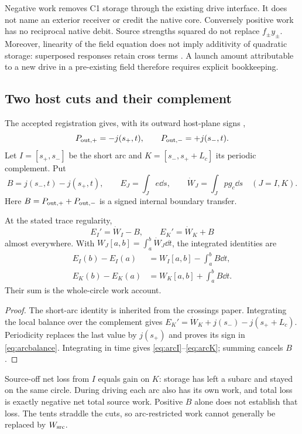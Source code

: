 Negative work removes C1 storage through the existing drive interface. It does not name an exterior receiver or credit the native core. Conversely positive work has no reciprocal native debit. Source strengths squared do not replace $f_\pm y_\pm$. Moreover, linearity of the field equation does not imply additivity of quadratic storage: superposed responses retain cross terms \cite[quadratic storage account]{pairedII}. A launch amount attributable to a new drive in a pre-existing field therefore requires explicit bookkeeping.

\subsection{Two host cuts and their complement}\label{sec:arcs}
The accepted registration gives, with its outward host-plane signs \cite[conditional signed cut powers]{intensity},
\begin{equation}\label{eq:cuts}
 P_{\rm out,+}=-j(s_+,t),\qquad
 P_{\rm out,-}=+j(s_-,t).
\end{equation}
Let $I=[s_+,s_-]$ be the short arc and $K=[s_-,s_++L_c]$ its periodic complement. Put
\begin{equation}\label{eq:arcterms}
 B=j(s_-,t)-j(s_+,t),\qquad
 E_J=\int_J e\dd s,\qquad \dot W_J=\int_J pg_c\dd s
 \quad(J=I,K).
\end{equation}
Here $B=P_{\rm out,+}+P_{\rm out,-}$ is a signed internal boundary transfer.

\begin{proposition}\label{prop:arcs}
At the stated trace regularity,
\begin{equation}\label{eq:arcbalance}
 E_I'=\dot W_I-B,\qquad E_K'=\dot W_K+B
\end{equation}
almost everywhere. With $W_J[a,b]=\int_a^b\dot W_J\dd t$, the integrated identities are
\begin{align}
 E_I(b)-E_I(a)&=W_I[a,b]-\int_a^bB\dd t,\label{eq:arcI}\\
 E_K(b)-E_K(a)&=W_K[a,b]+\int_a^bB\dd t.\label{eq:arcK}
\end{align}
Their sum is the whole-circle work account.
\end{proposition}
\begin{proof}
The short-arc identity is inherited from the crossings paper. Integrating the local balance over the complement gives
$E_K'=\dot W_K+j(s_-)-j(s_++L_c)$. Periodicity replaces the last value by $j(s_+)$ and proves its sign in \eqref{eq:arcbalance}. Integrating in time gives \eqref{eq:arcI}--\eqref{eq:arcK}; summing cancels $B$.
\end{proof}
Source-off net loss from $I$ equals gain on $K$: storage has left a subarc and stayed on the same circle. During driving each arc also has its own work, and total loss is exactly negative net total source work. Positive $B$ alone does not establish that loss. The tents straddle the cuts, so arc-restricted work cannot generally be replaced by $W_{\rm src}$.

